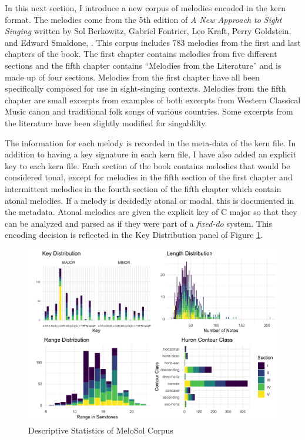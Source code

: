\documentclass[12pt,]{book}
\begin{document}
In this next section, I introduce a new corpus of melodies encoded in the kern format.
The melodies come from the 5th edition of \emph{A New Approach to Sight Singing} written by Sol Berkowitz, Gabriel Fontrier, Leo Kraft, Perry Goldstein, and Edward Smaldone, \citep{berkowitzNewApproachSight2011}.
This corpus includes 783 melodies from the first and last chapters of the book.
The first chapter contains melodies from five different sections and the fifth chapter contains ``Melodies from the Literature'' and is made up of four sections.
Melodies from the first chapter have all been specifically composed for use in sight-singing contexts.
Melodies from the fifth chapter are small excerpts from examples of both excerpts from Western Classical Music canon and traditional folk songs of various countries.
Some excerpts from the literature have been slightly modified for singablilty.

The information for each melody is recorded in the meta-data of the kern file.
In addition to having a key signature in each kern file, I have also added an explicit key to each kern file.
Each section of the book contains melodies that would be considered tonal, except for melodies in the fifth section of the first chapter and intermittent melodies in the fourth section of the fifth chapter which contain atonal melodies.
If a melody is decidedly atonal or modal, this is documented in the metadata.
Atonal melodies are given the explicit key of C major so that they can be analyzed and parsed as if they were part of a \emph{fixed-do} system.
This encoding decision is reflected in the Key Distribution panel of Figure \ref{fig:melosoldescriptivepanel}.

\begin{figure}

{\centering \includegraphics[width=1\linewidth]{img/melosoldescriptpanel} 

}

\caption{Descriptive Statistics of MeloSol Corpus}\label{fig:melosoldescriptivepanel}
\end{figure}
\end{document}
